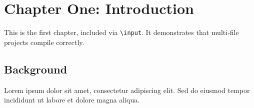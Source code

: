 \section{Chapter One: Introduction}
This is the first chapter, included via \texttt{{\textbackslash}input}.
It demonstrates that multi-file projects compile correctly.

\subsection{Background}
Lorem ipsum dolor sit amet, consectetur adipiscing elit.
Sed do eiusmod tempor incididunt ut labore et dolore magna aliqua.
